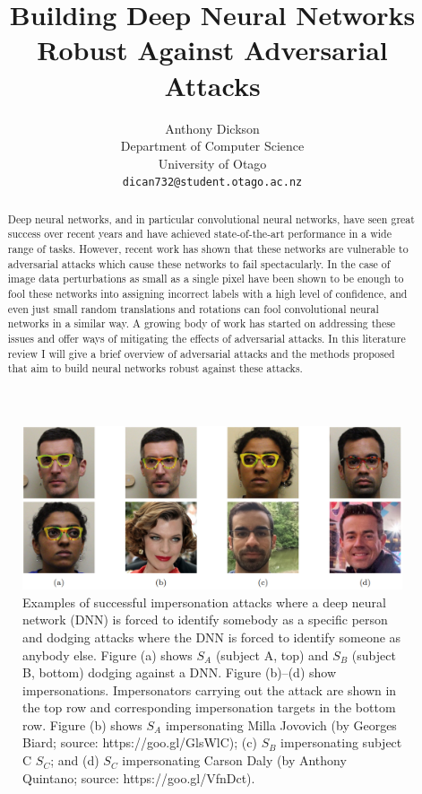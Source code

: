\documentclass{article}
\title{Building Deep Neural Networks Robust Against Adversarial Attacks}
\author{
  Anthony Dickson \\
  Department of Computer Science\\
  University of Otago\\
  \texttt{dican732@student.otago.ac.nz} \\
}
\begin{document}
\maketitle

\begin{abstract}
Deep neural networks, and in particular convolutional neural networks, have seen great success over recent years and have achieved state-of-the-art performance in a wide range of tasks. However, recent work has shown that these networks are vulnerable to adversarial attacks which cause these networks to fail spectacularly. In the case of image data perturbations as small as a single pixel have been shown to be enough to fool these networks into assigning incorrect labels with a high level of confidence, and even just small random translations and rotations can fool convolutional neural networks in a similar way.  A growing body of work has started on addressing these issues and offer ways of mitigating the effects of adversarial attacks. In this literature review I will give a brief overview of adversarial attacks and the methods proposed that aim to build neural networks robust against these attacks.
\end{abstract}

\begin{figure}[h!]
    \centering
    \includegraphics[width=\linewidth]{figures/dnn-impersonation.png}
    \caption{ Examples of successful impersonation attacks where a deep neural network (DNN) is forced to identify somebody as a specific person and dodging attacks where the DNN is forced to identify someone as anybody else. Figure (a) shows $S_A$ (subject A, top) and $S_B$ (subject B, bottom) dodging against a DNN. Figure (b)–(d) show impersonations. Impersonators carrying out the attack are shown in the top row and corresponding impersonation targets in the bottom row. Figure (b) shows $S_A$ impersonating Milla Jovovich (by Georges Biard; source: https://goo.gl/GlsWlC); (c) $S_B$ impersonating subject C $S_C$; and (d) $S_C$ impersonating Carson Daly (by Anthony Quintano; source: https://goo.gl/VfnDct).\protect\footnotemark}
    \label{fig:dnn_impersonation}
\end{figure}
\end{document}
